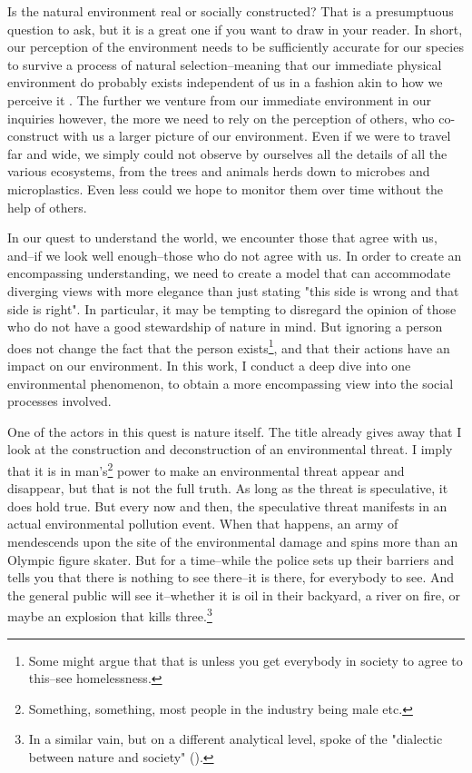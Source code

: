 
Is the natural environment real or socially constructed? That is a presumptuous question to ask, but it is a great one if you want to draw in your reader. In short, our perception of the environment needs to be sufficiently accurate for our species to survive a process of natural selection--meaning that our immediate physical environment do probably exists independent of us in a fashion akin to how we perceive it \citep{Hoffman2015a}. The further we venture from our immediate environment in our inquiries however, the more we need to rely on the perception of others, who co-construct with us a larger picture of our environment. Even if we were to travel far and wide, we simply could not observe by ourselves all the details of all the various ecosystems, from the trees and animals herds down to microbes and microplastics. Even less could we hope to monitor them over time without the help of others. 

In our quest to understand the world, we encounter those that agree with us, and--if we look well enough--those who do not agree with us. In order to create an encompassing understanding, we need to create a model that can accommodate diverging views with more elegance than just stating "this side is wrong and that side is right". In particular, it may be tempting to disregard the opinion of those who do not have a good stewardship of nature in mind. But ignoring a person does not change the fact that the person exists\footnote{Some might argue that that is unless you get everybody in society to agree to this--see homelessness.}, and that their actions have an impact on our environment. In this work, I conduct a deep dive into one environmental phenomenon, to obtain a more encompassing view into the social processes involved.

One of the actors in this quest is nature itself. The title already gives away that I look at the construction and deconstruction of an environmental threat. I imply that it is in man's\footnote{\label{note1}Something, something, most people in the industry being male etc.} power to make an environmental threat appear and disappear, but that is not the full truth. As long as the threat is speculative, it does hold true. But every now and then, the speculative threat manifests in an actual environmental pollution event. When that happens, an army of men\footnotemark[\ref{note1}] descends upon the site of the environmental damage and spins more than an Olympic figure skater. But for a time--while the police sets up their barriers and tells you that there is nothing to see there--it is there, for everybody to see. And the general public will see it--whether it is oil in their backyard, a river on fire, or maybe an explosion that kills three.\footnote{In a similar vain, but on a different analytical level, \citeauthor{Berger1991} spoke of the "dialectic between nature and society" (\citeyear[p. 201]{Berger1991}).}

